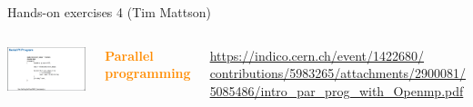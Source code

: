 \documentclass[aspectratio=169]{beamer}
\begin{document}
\begin{frame}{Hands-on exercises 4 (Tim Mattson)}
\vspace{0.25 cm}
\large
\begin{columns}
\includegraphics[width=\linewidth]{PLOTS/parallel-processing.png}

\vspace{0.2 cm}

\textcolor{darkorange}{\bf Parallel programming}

\tiny
\vspace{0.2 cm}
\textcolor{blue}{\href{https://indico.cern.ch/event/1422680/contributions/5983265/attachments/2900081/5085486/intro_par_prog_with_Openmp.pdf}{https://indico.cern.ch/event/1422680/ \\
%
contributions/5983265/attachments/2900081/
%
5085486/intro\_par\_prog\_with\_Openmp.pdf}}

\small
\vspace{0.2 cm}

\vspace{0.2 cm}

\vspace{0.2 cm}

\vspace{0.2 cm}

\end{columns}
\end{frame}
\end{document}
